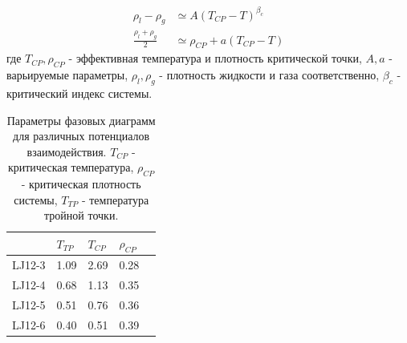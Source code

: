 \documentclass[pdf,hyperref={unicode}]{beamer}
\begin{document}
\begin{frame}
\begin{columns}
\begin{column}{0.45\linewidth}
{\tiny{
\begin{equation}
\begin{aligned}
\rho_l - \rho_g &\simeq A (T_{CP} - T)^{\beta_c} \\
\frac{\rho_l + \rho_g}{2} &\simeq \rho_{CP} + a(T_{CP} - T)
\end{aligned}
\label{eqFitFhase}
\end{equation}
где $T_{CP}, \rho_{CP}$ - эффективная температура и плотность критической точки, $A, a$ - варьируемые параметры, $\rho_l, \rho_g$ - плотность жидкости и газа соответственно, $\beta_c$ - критический индекс системы.
}}
{
\tiny{
\begin{table}[h]
\begin{tabular}{| l | l | l | l | l |}
\hline
    & $T_{TP}$  & $T_{CP}$  & $\rho_{CP}$   \\ \hline
LJ12-3  & 1.09  &  2.69   &  0.28   \\ \hline
LJ12-4  & 0.68  & 1.13    & 0.35    \\ \hline
LJ12-5  & 0.51  &  0.76   &  0.36   \\ \hline
LJ12-6  & 0.40  &  0.51   &  0.39   \\ \hline
\end{tabular}
\caption{\tiny Параметры фазовых диаграмм для различных потенциалов взаимодействия. $T_{CP}$ - критическая температура, $\rho_{CP}$ - критическая плотность системы, $T_{TP}$ - температура тройной точки.}
\label{tablSystemConst}
\end{table}
}
}
\end{column}

\end{columns}
\end{frame}
\end{document}
